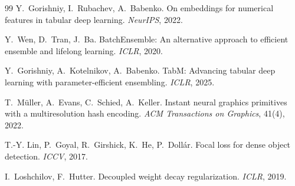 \documentclass[11pt,a4paper]{article}
\begin{document}
\begin{thebibliography}{99}
 Y.~Gorishniy, I.~Rubachev, A.~Babenko. On embeddings for numerical features in tabular deep learning. \emph{NeurIPS}, 2022.

 Y.~Wen, D.~Tran, J.~Ba. BatchEnsemble: An alternative approach to efficient ensemble and lifelong learning. \emph{ICLR}, 2020.

 Y.~Gorishniy, A.~Kotelnikov, A.~Babenko. TabM: Advancing tabular deep learning with parameter-efficient ensembling. \emph{ICLR}, 2025.

 T.~M\"uller, A.~Evans, C.~Schied, A.~Keller. Instant neural graphics primitives with a multiresolution hash encoding. \emph{ACM Transactions on Graphics}, 41(4), 2022.

 T.-Y. Lin, P.~Goyal, R.~Girshick, K.~He, P.~Doll\'ar. Focal loss for dense object detection. \emph{ICCV}, 2017.

 I.~Loshchilov, F.~Hutter. Decoupled weight decay regularization. \emph{ICLR}, 2019.

\end{thebibliography}
\end{document}
